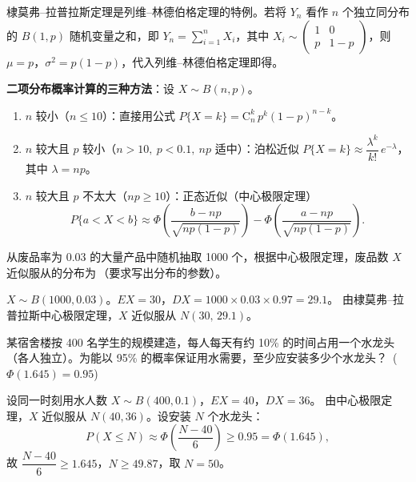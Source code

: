 \documentclass[lang=cn,11pt]{elegantbook}
\begin{document}
\begin{note}
棣莫弗--拉普拉斯定理是列维--林德伯格定理的特例。若将 \(Y_n\) 看作 \(n\) 个独立同分布的 \(B(1,p)\) 随机变量之和，即 \(Y_n = \sum_{i=1}^{n} X_i\)，其中 \(X_i \sim \begin{pmatrix} 1 & 0 \\ p & 1-p \end{pmatrix}\)，则 \(\mu = p\)，\(\sigma^2 = p(1-p)\)，代入列维--林德伯格定理即得。

\textbf{二项分布概率计算的三种方法}：设 \(X \sim B(n, p)\)。
\begin{enumerate}
    \item \(n\) 较小（\(n \leq 10\)）：直接用公式 \(P\{X=k\} = \mathrm{C}_n^k\,p^k(1-p)^{n-k}\)。
    \item \(n\) 较大且 \(p\) 较小（\(n > 10,\ p < 0.1,\ np\) 适中）：泊松近似 \(\displaystyle P\{X=k\} \approx \dfrac{\lambda^k}{k!}\,e^{-\lambda}\)，其中 \(\lambda = np\)。
    \item \(n\) 较大且 \(p\) 不太大（\(np \geq 10\)）：正态近似（中心极限定理）
    \[
    P\{a < X < b\} \approx \Phi\!\left(\frac{b-np}{\sqrt{np(1-p)}}\right) - \Phi\!\left(\frac{a-np}{\sqrt{np(1-p)}}\right).
    \]
\end{enumerate}
\end{note}

\begin{exercise}\label{exer:5-dml-identify}
从废品率为 0.03 的大量产品中随机抽取 1000 个，根据中心极限定理，废品数 \(X\) 近似服从的分布为\,\underline{\hspace{2cm}}（要求写出分布的参数）。
\end{exercise}
\begin{solution}
\(X \sim B(1000, 0.03)\)。\(EX = 30\)，\(DX = 1000 \times 0.03 \times 0.97 = 29.1\)。
由棣莫弗--拉普拉斯中心极限定理，\(X\) 近似服从 \(N(30,\, 29.1)\)。
\end{solution}

\begin{exercise}\label{exer:5-clt-tap}
某宿舍楼按 400 名学生的规模建造，每人每天有约 10\% 的时间占用一个水龙头（各人独立）。为能以 95\% 的概率保证用水需要，至少应安装多少个水龙头？\ (\(\Phi(1.645) = 0.95\))
\end{exercise}
\begin{solution}
设同一时刻用水人数 \(X \sim B(400, 0.1)\)，\(EX = 40\)，\(DX = 36\)。
由中心极限定理，\(X\) 近似服从 \(N(40, 36)\)。设安装 \(N\) 个水龙头：
\[
P(X \leq N) \approx \Phi\!\left(\frac{N - 40}{6}\right) \geq 0.95 = \Phi(1.645),
\]
故 \(\dfrac{N-40}{6} \geq 1.645\)，\(N \geq 49.87\)，取 \(N = 50\)。
\end{solution}
\end{document}
